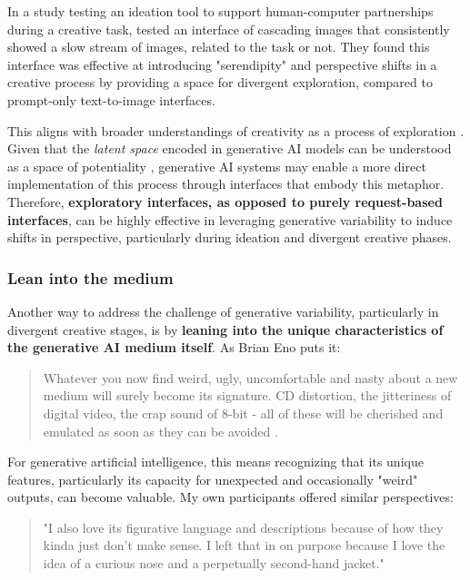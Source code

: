 In a study testing an ideation tool to support human-computer partnerships during a creative task, \cite{Koch2020-gx} tested an interface of cascading images that consistently showed a slow stream of images, related to the task or not. They found this interface was effective at introducing "serendipity" and perspective shifts in a creative process by providing a space for divergent exploration, compared to prompt-only text-to-image interfaces.

This aligns with broader understandings of creativity as a process of exploration \cite{Boden1998-yn, Wiggins2019-yj}. Given that the \textit{latent space} encoded in generative AI models can be understood as a space of potentiality \cite{Schaerf2024-gf}, generative AI systems may enable a more direct implementation of this process through interfaces that embody this metaphor. Therefore, \textbf{exploratory interfaces, as opposed to purely request-based interfaces}, can be highly effective in leveraging generative variability to induce shifts in perspective, particularly during ideation and divergent creative phases. 


\subsubsection{Lean into the medium}

Another way to address the challenge of generative variability, particularly in divergent creative stages, is by \textbf{leaning into the unique characteristics of the generative AI medium itself}. As Brian Eno puts it:

\begin{quote}
    Whatever you now find weird, ugly, uncomfortable and nasty about a new medium will surely become its signature. CD distortion, the jitteriness of digital video, the crap sound of 8-bit - all of these will be cherished and emulated as soon as they can be avoided \cite{Eno2007-fl}.
\end{quote}

For generative artificial intelligence, this means recognizing that its unique features, particularly its capacity for unexpected and occasionally "weird" outputs, can become valuable. My own participants offered similar perspectives:

\begin{quote}
"I also love its figurative language and descriptions because of how they kinda just don't make sense. I left that in on purpose because I love the idea of a curious nose and a perpetually second-hand jacket."
\end{quote}

